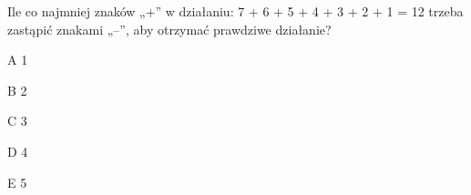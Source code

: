 \begin{tresc}
Ile co najmniej znaków „+” w działaniu: 7 + 6 + 5 + 4 + 3 + 2 + 1 = 12 trzeba zastąpić znakami „–”, aby otrzymać prawdziwe działanie?
\end{tresc}
\begin{wariant}{A} 1 \end{wariant}
\begin{wariant}{B} 2 \end{wariant}
\begin{wariant}{C} 3 \end{wariant}
\begin{wariant}{D} 4 \end{wariant}
\begin{wariant}{E} 5 \end{wariant}
